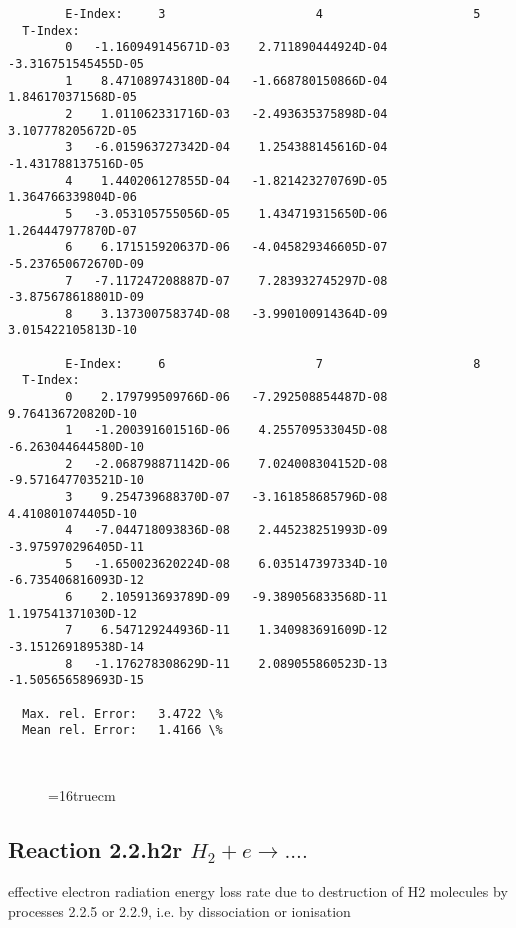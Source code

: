\documentclass[12pt,dvipdfmx]{article}
\begin{document}
{\begin{small}
\begin{verbatim}
        E-Index:     3                     4                     5
  T-Index:
        0   -1.160949145671D-03    2.711890444924D-04   -3.316751545455D-05
        1    8.471089743180D-04   -1.668780150866D-04    1.846170371568D-05
        2    1.011062331716D-03   -2.493635375898D-04    3.107778205672D-05
        3   -6.015963727342D-04    1.254388145616D-04   -1.431788137516D-05
        4    1.440206127855D-04   -1.821423270769D-05    1.364766339804D-06
        5   -3.053105755056D-05    1.434719315650D-06    1.264447977870D-07
        6    6.171515920637D-06   -4.045829346605D-07   -5.237650672670D-09
        7   -7.117247208887D-07    7.283932745297D-08   -3.875678618801D-09
        8    3.137300758374D-08   -3.990100914364D-09    3.015422105813D-10

        E-Index:     6                     7                     8
  T-Index:
        0    2.179799509766D-06   -7.292508854487D-08    9.764136720820D-10
        1   -1.200391601516D-06    4.255709533045D-08   -6.263044644580D-10
        2   -2.068798871142D-06    7.024008304152D-08   -9.571647703521D-10
        3    9.254739688370D-07   -3.161858685796D-08    4.410801074405D-10
        4   -7.044718093836D-08    2.445238251993D-09   -3.975970296405D-11
        5   -1.650023620224D-08    6.035147397334D-10   -6.735406816093D-12
        6    2.105913693789D-09   -9.389056833568D-11    1.197541371030D-12
        7    6.547129244936D-11    1.340983691609D-12   -3.151269189538D-14
        8   -1.176278308629D-11    2.089055860523D-13   -1.505656589693D-15

  Max. rel. Error:   3.4722 \%
  Mean rel. Error:   1.4166 \%



\end{verbatim}\end{small}
\begin{figure} \label{2.2.h2c}
\epsfxsize=16truecm
\end{figure}
\newpage

\subsection{
  Reaction 2.2.h2r $H_2 + e \rightarrow  ....$
}

   effective electron radiation energy loss rate due to destruction of H2 molecules by
   processes 2.2.5 or 2.2.9, i.e. by dissociation or ionisation


\begin{small}\begin{verbatim}


\end{verbatim}
\end{small}}
\end{document}
